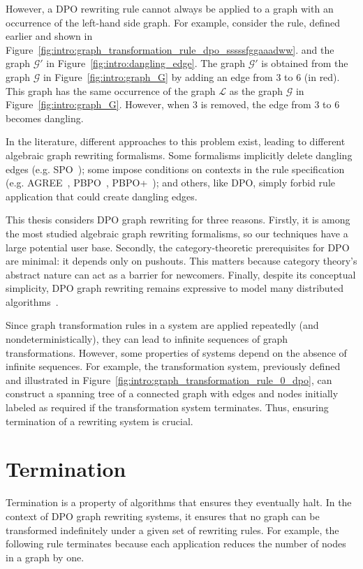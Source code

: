 However, a DPO rewriting rule cannot always be applied to a graph with an occurrence of the left-hand side graph.
For example, consider the rule, defined earlier and shown in Figure~\ref{fig:intro:graph_transformation_rule_dpo_sssssfggaaadww}. and the graph $\mathcal{G}'$ in Figure~\ref{fig:intro:dangling_edge}. The graph $\mathcal{G}'$ is obtained from the graph $\mathcal{G}$ in Figure~\ref{fig:intro:graph_G} by adding an edge from $3$ to $6$ (in red). This graph has the same occurrence of the graph $\mathcal{L}$ as the graph $\mathcal{G}$ in Figure~\ref{fig:intro:graph_G}.
However, when $3$ is removed, the edge from $3$ to $6$ becomes dangling.

In the literature, different approaches to this problem exist, leading to different algebraic graph rewriting formalisms. Some formalisms implicitly delete dangling edges (e.g. SPO~\cite{ehrig1997algebraic}); 
some impose conditions on contexts in the rule specification (e.g. AGREE~\cite{corradini2015agree}, PBPO~\cite{corradini2019thepbpo}, PBPO+~\cite{overbeek2023graph}); and others, like DPO, simply forbid rule application that could create dangling edges.

   This thesis considers DPO graph rewriting for three reasons.
   Firstly, it is among the most studied algebraic graph rewriting formalisms, so our techniques have a large potential user base.
   Secondly, the category-theoretic prerequisites for DPO are minimal: it depends only on pushouts. This matters because category theory's abstract nature can act as a barrier for newcomers.
    Finally, despite its conceptual simplicity, DPO graph rewriting remains expressive to model many distributed algorithms~\cite{ehrig2006fundamentals,corradini1997algebraic}.
    
Since graph transformation rules in a system are applied repeatedly (and nondeterministically), they can lead to infinite sequences of graph transformations. However, some properties of systems depend on the absence of infinite sequences. For example, the transformation system, previously defined and illustrated in Figure~\ref{fig:intro:graph_transformation_rule_0_dpo}, can construct a spanning tree of a connected graph with edges and nodes initially labeled as required if the transformation system terminates. Thus, ensuring termination of a rewriting system is crucial.

\section{Termination} 
Termination is a property of algorithms that ensures they eventually halt. In the context of DPO graph rewriting systems, it ensures that no graph can be transformed indefinitely under a given set of rewriting rules. 
For example, the following rule terminates because each application reduces the number of nodes in a graph by one.

